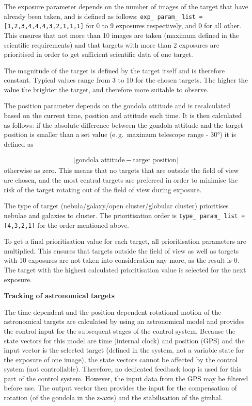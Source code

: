 The exposure parameter depends on the number of images of the target that have already been taken, and is defined as follows: \texttt{exp\_ param\_ list = [1,2,3,4,4,4,3,2,1,1,1]} for 0 to 9 exposures respectively, and 0 for all other. This ensures that not more than 10 images are taken (maximum defined in the scientific requirements) and that targets with more than 2 exposures are prioritised in order to get sufficient scientific data of one target.

The magnitude of the target is defined by the target itself and is therefore constant. Typical values range from 3 to 10 for the chosen targets. The higher the value the brighter the target, and therefore more suitable to observe.

The position parameter depends on the gondola attitude and is recalculated based on the current time, position and attitude each time. It is then calculated as follows: if the absolute difference between the gondola attitude and the target position is smaller than a set value (e.\,g.~maximum telescope range - $\ang{30}$) it is defined as 

\begin{align*}
	\left|\text{gondola attitude} - \text{target position} \right|
\end{align*}
otherwise as zero. This means that no targets that are outside the field of view are chosen, and the most central targets are preferred in order to minimise the risk of the target rotating out of the field of view during exposure.

The type of target (nebula/galaxy/open cluster/globular cluster) prioritises nebulae and galaxies to cluster. The prioritisation order is \texttt{type\_ param\_ list = [4,3,2,1]} for the order mentioned above.

To get a final prioritisation value for each target, all prioritisation parameters are multiplied. This ensures that targets outside the field of view as well as targets with 10 exposures are not taken into consideration any more, as the result is 0. The target with the highest calculated prioritisation value is selected for the next exposure.



\textbf{Tracking of astronomical targets}

The time-dependent and the position-dependent rotational motion of the astronomical targets are calculated by using an astronomical model and provides the control input for the subsequent stages of the control system. Because the state vectors for this model are time (internal clock) and position (GPS) and the input vector is the selected target (defined in the system, not a variable state for the exposure of one image), the state vectors cannot be affected by the control system (not controllable). Therefore, no dedicated feedback loop is used for this part of the control system. However, the input data from the GPS may be filtered before use. The output vector then provides the input for the compensation of rotation (of the gondola in the z-axis) and the stabilisation of the gimbal.

